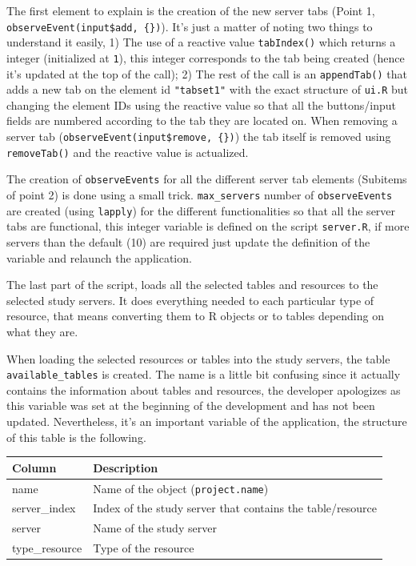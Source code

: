\documentclass[
]{book}
\begin{document}
The first element to explain is the creation of the new server tabs (Point 1, \texttt{observeEvent(input\$add,\ \{\})}). It's just a matter of noting two things to understand it easily, 1) The use of a reactive value \texttt{tabIndex()} which returns a integer (initialized at \texttt{1}), this integer corresponds to the tab being created (hence it's updated at the top of the call); 2) The rest of the call is an \texttt{appendTab()} that adds a new tab on the element id \texttt{"tabset1"} with the exact structure of \texttt{ui.R} but changing the element IDs using the reactive value so that all the buttons/input fields are numbered according to the tab they are located on. When removing a server tab (\texttt{observeEvent(input\$remove,\ \{\})}) the tab itself is removed using \texttt{removeTab()} and the reactive value is actualized.

The creation of \texttt{observeEvents} for all the different server tab elements (Subitems of point 2) is done using a small trick. \texttt{max\_servers} number of \texttt{observeEvents} are created (using \texttt{lapply}) for the different functionalities so that all the server tabs are functional, this integer variable is defined on the script \texttt{server.R}, if more servers than the default (10) are required just update the definition of the variable and relaunch the application.

The last part of the script, loads all the selected tables and resources to the selected study servers. It does everything needed to each particular type of resource, that means converting them to R objects or to tables depending on what they are.

When loading the selected resources or tables into the study servers, the table \texttt{available\_tables} is created. The name is a little bit confusing since it actually contains the information about tables and resources, the developer apologizes as this variable was set at the beginning of the development and has not been updated. Nevertheless, it's an important variable of the application, the structure of this table is the following.

\begin{longtable}[]{@{}ll@{}}
\toprule
Column & Description \\
\midrule
\endhead
name & Name of the object (\texttt{project.name}) \\
server\_index & Index of the study server that contains the table/resource \\
server & Name of the study server \\
type\_resource & Type of the resource \\
\bottomrule
\end{longtable}
\end{document}
